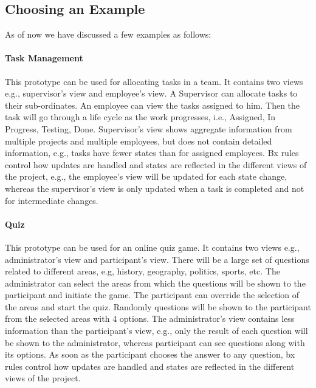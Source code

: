\subsection{Choosing an Example}\label{subsec:examples}
As of now we have discussed a few examples as follows:
\paragraph{Task Management} This prototype can be used for allocating tasks in a team. It contains two views e.g., supervisor's view and employee's view. A Supervisor can allocate tasks to their sub-ordinates. An employee can view the tasks assigned to him. Then the task will go through a life cycle as the work progresses, i.e., Assigned, In Progress, Testing, Done. Supervisor's view shows aggregate information from multiple projects and multiple employees, but does not contain detailed information, e.g., tasks have fewer states than for assigned employees. Bx rules control how updates are handled and states are reflected in the different views of the project, e.g., the employee's view will be updated for each state change, whereas the supervisor's view is only updated when a task is completed and not for intermediate changes.

\paragraph{Quiz} This prototype can be used for an online quiz game. It contains two views e.g., administrator's view and participant's view.
There will be a large set of questions related to different areas, e.g, history, geography, politics, sports, etc. The administrator can select the areas from which the questions will be shown to the participant and initiate the game. The participant can override the selection of the areas and start the quiz. Randomly questions will be shown to the participant from the selected areas with 4 options. The administrator's view contains less information than the participant's view, e.g., only the result of each question will be shown to the administrator, whereas participant can see questions along with its options. As soon as the participant chooses the answer to any question, bx rules control how updates are handled and states are reflected in the different views of the project.

